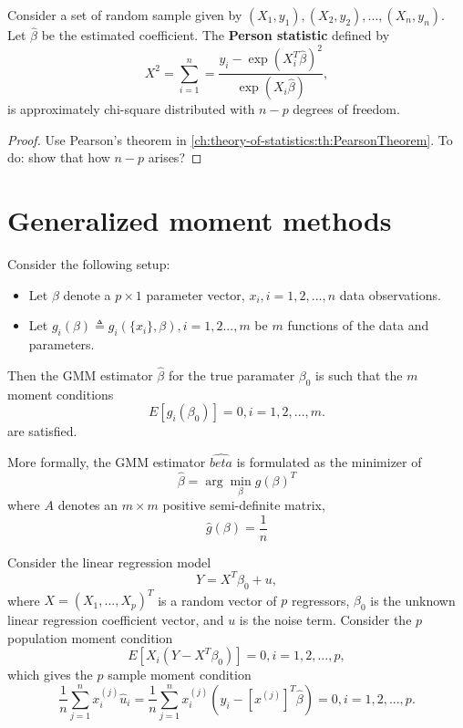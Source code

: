 \begin{refsection}
\begin{lemma}
Consider a set of random sample given by $(X_1,y_1),(X_2,y_2),...,(X_n,y_n)$.
Let $\hat{\beta}$ be the estimated coefficient.
The \textbf{Person statistic} defined by
$$X^2 = \sum_{i=1}^{n}=\frac{y_i - \exp(X_i^T\hat{\beta})^2}{\exp(X_i\hat{\beta})},$$
is approximately chi-square distributed with $n-p$ degrees of freedom.	
\end{lemma}
\begin{proof}
Use Pearson's theorem in \autoref{ch:theory-of-statistics:th:PearsonTheorem}. To do: show that how $n-p$ arises?
\end{proof}



\section{Generalized moment methods}
\begin{method}
Consider the following setup:
\begin{itemize}
	\item Let $\beta$ denote a $p\times 1$ parameter vector, $x_i, i=1,2,...,n$ data observations.
	\item Let $g_i(\beta) \triangleq g_i(\{x_i\}, \beta), i=1,2...,m $ be $m$ functions of the data and parameters.
\end{itemize}	

Then the GMM estimator $\hat{\beta}$ for the true paramater $\beta_0$ is such that the $m$ moment conditions
$$E[g_i(\beta_0)] = 0, i=1,2,...,m.$$
are satisfied.

More formally, the GMM estimator $\hat{beta}$ is formulated as the minimizer of
$$\hat{\beta} = \arg\min_{\beta} \hat{g}(\beta)^T$$	
where $A$ denotes an $m\times m$ positive semi-definite matrix,
$$\hat{g}(\beta) = \frac{1}{n}$$	
\end{method}


\begin{example}
Consider the linear regression model
$$Y = X^T\beta_0 + u,$$
where $X = (X_1,...,X_p)^T$ is a random vector of $p$ regressors, $\beta_0$ is the unknown linear regression coefficient vector, and $u$ is the noise term. 
Consider the $p$ population moment condition 
$$E[X_i(Y - X^T\beta_0)] = 0, i=1,2,...,p,$$
which gives the $p$ sample moment condition
$$\frac{1}{n}\sum_{j=1}^n x_i^{(j)} \hat{u}_i = \frac{1}{n}\sum_{j=1}^n x_i^{(j)} (y_i - [x^{(j)}]^T\hat{\beta}) = 0, i=1,2,...,p.$$
\end{example}




\end{refsection}
